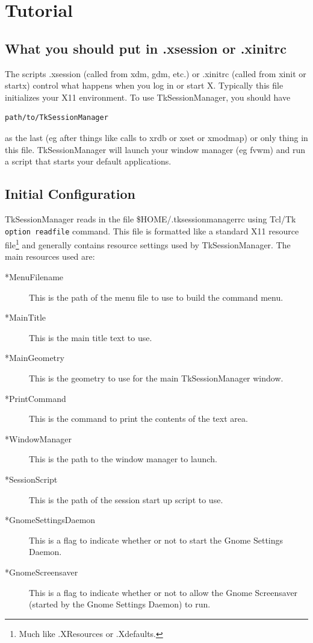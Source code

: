 \chapter{Tutorial}
\label{chpt:Tutorial}

\section{What you should put in .xsession or .xinitrc}

The scripts .xsession (called from xdm, gdm, etc.) or .xinitrc (called
from xinit or startx) control what happens when you log in or start X. 
Typically this file initializes your X11 environment.  To use
TkSessionManager, you should have 

\begin{verbatim}
path/to/TkSessionManager
\end{verbatim}

as the last (eg after things like calls to xrdb or xset or xmodmap) or
only thing in this file.  TkSessionManager will launch your window
manager (eg fvwm) and run a script that starts your default
applications. 

\section{Initial Configuration}

TkSessionManager reads in the file \$HOME/.tksessionmanagerrc using
Tcl/Tk \texttt{option readfile} command.  This file is formatted like a
standard X11 resource file\footnote{Much like .XResources or
.Xdefaults.} and generally contains resource settings used by
TkSessionManager.  The main resources used are:

\begin{description}
\item[*MenuFilename] This is the path of the menu file to use to build
the command menu.
\item[*MainTitle] This is the main title text to use.
\item[*MainGeometry] This is the geometry to use for the main
TkSessionManager window.
\item[*PrintCommand] This is the command to print the contents of the
text area.
\item[*WindowManager] This is the path to the window manager to launch.
\item[*SessionScript] This is the path of the session start up script to
use.
\item[*GnomeSettingsDaemon] This is a flag to indicate whether or not to
start the Gnome Settings Daemon.
\item[*GnomeScreensaver] This is a flag to indicate whether or not to
allow the Gnome Screensaver (started by the Gnome Settings Daemon) to run.
\end{description}

